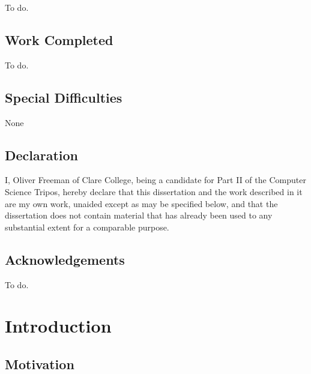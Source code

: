 \documentclass[12pt,twoside,notitlepage]{report}
\begin{document}
To do.


\section*{Work Completed}

To do.

\section*{Special Difficulties}

None
 
\newpage
\section*{Declaration}

I, Oliver Freeman of Clare College, being a candidate for Part II of the Computer
Science Tripos, hereby declare that this dissertation and the work described in it are my own work,
unaided except as may be specified below, and that the dissertation
does not contain material that has already been used to any substantial
extent for a comparable purpose.

\bigskip
{}

\medskip
{}

\cleardoublepage

\tableofcontents

\listoffigures

\newpage
\section*{Acknowledgements}

To do.


\cleardoublepage        %

\setcounter{page}{1}
\pagestyle{headings}

\chapter{Introduction}

\section{Motivation}
\end{document}
